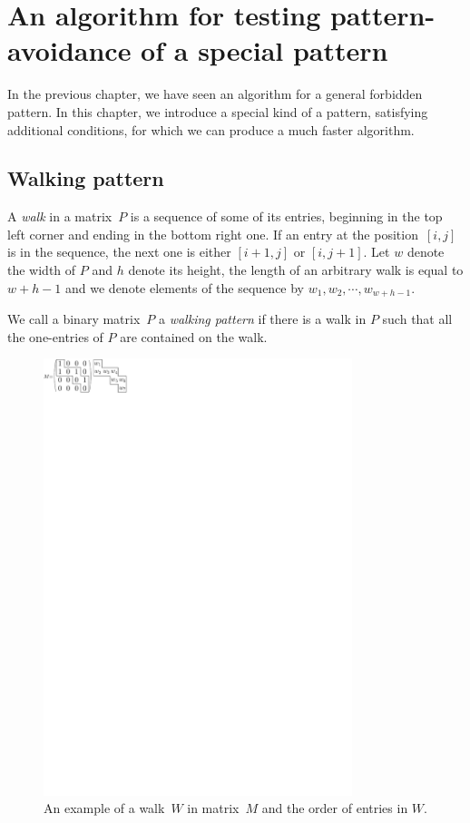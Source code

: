 \chapter{An algorithm for testing pattern-avoidance of a special pattern}
\label{chap:walking}
In the previous chapter, we have seen an algorithm for a general forbidden pattern. In this chapter, we introduce a special kind of a pattern, satisfying additional conditions, for which we can produce a much faster algorithm.

\section{Walking pattern}
\begin{defn}
A \emph{walk} in a matrix~$P$ is a sequence of some of its entries, beginning in the top left corner and ending in the bottom right one. If an entry at the position~$[i,j]$ is in the sequence, the next one is either $[i+1,j]$ or $[i,j+1]$. Let $w$ denote the width of $P$ and $h$ denote its height, the length of an arbitrary walk is equal to $w+h-1$ and we denote elements of the sequence by $w_1,w_2,\cdots,w_{w+h-1}$.
\end{defn}
\begin{defn}
We call a binary matrix~$P$ a \emph{walking pattern} if there is a walk in $P$ such that all the one-entries of $P$ are contained on the walk.
\end{defn}
\begin{figure}[h!]
\centering
\includegraphics[width=90mm]{../img/walk.pdf}
\caption{An example of a walk~$W$ in matrix~$M$ and the order of entries in $W$.}
\label{walk}
\end{figure}

